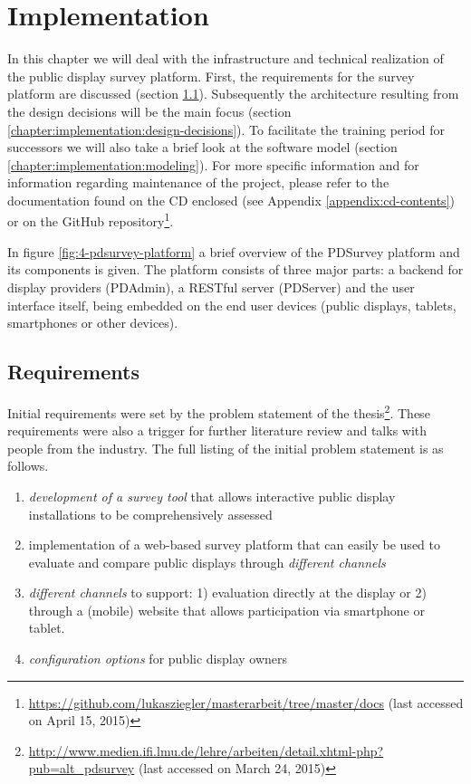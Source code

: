 \section{Implementation}
\label{chapter:implementation}

	In this chapter we will deal with the infrastructure and technical realization of the public display survey platform. First, the requirements for the survey platform are discussed (section \ref{chapter:implementation:requirements}). Subsequently the architecture resulting from the design decisions will be the main focus (section \ref{chapter:implementation:design-decisions}). To facilitate the training period for successors we will also take a brief look at the software model (section \ref{chapter:implementation:modeling}). For more specific information and for information regarding maintenance of the project, please refer to the documentation found on the CD enclosed (see Appendix \ref{appendix:cd-contents}) or on the GitHub repository\footnote{\url{https://github.com/lukasziegler/masterarbeit/tree/master/docs} (last accessed on April 15, 2015)}.

	In figure \ref{fig:4-pdsurvey-platform} a brief overview of the PDSurvey platform and its components is given. The platform consists of three major parts: a backend for display providers (PDAdmin), a RESTful server (PDServer) and the user interface itself, being embedded on the end user devices (public displays, tablets, smartphones or other devices). 





\subsection{Requirements}
\label{chapter:implementation:requirements}

	Initial requirements were set by the problem statement of the thesis\footnote{\url{http://www.medien.ifi.lmu.de/lehre/arbeiten/detail.xhtml-php?pub=alt_pdsurvey} (last accessed on March 24, 2015)}. These requirements were also a trigger for further literature review and talks with people from the industry. The full listing of the initial problem statement is as follows.

	\begin{enumerate}[itemsep=0pt] 
	\item \textit{development of a survey tool} that allows interactive public display installations to be comprehensively assessed 
	\item implementation of a web-based survey platform that can easily be used to evaluate and compare public displays through \textit{different channels} 
	\item \textit{different channels} to support: 1) evaluation directly at
	the display or 2) through a (mobile) website that allows participation via smartphone or tablet.
	\item \textit{configuration options} for public display owners
	\end{enumerate}

